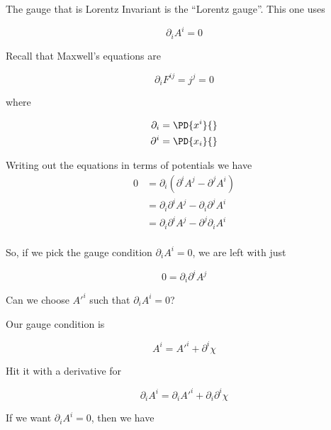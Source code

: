 The gauge that is Lorentz Invariant is the ``Lorentz gauge''.  This one uses

\begin{equation}\label{eqn:relativisticElectrodynamicsL14:390}
\partial_i A^i = 0
\end{equation}

Recall that Maxwell's equations are

\begin{equation}\label{eqn:relativisticElectrodynamicsL14:410}
\partial_i F^{ij} = j^j = 0
\end{equation}

where 

\begin{align}\label{eqn:relativisticElectrodynamicsL14:430}
\partial_i &= \PD{x^i}{} \\
\partial^i &= \PD{x_i}{}
\end{align}

Writing out the equations in terms of potentials we have
\begin{align*}
0 &= \partial_i (\partial^i A^j - \partial^j A^i)  \\
&= \partial_i \partial^i A^j - \partial_i \partial^j A^i \\
&= \partial_i \partial^i A^j - \partial^j \partial_i A^i \\
\end{align*}

So, if we pick the gauge condition $\partial_i A^i = 0$, we are left with just 

\begin{equation}\label{eqn:relativisticElectrodynamicsL14:450}
0 = \partial_i \partial^i A^j
\end{equation}

Can we choose ${A'}^i$ such that $\partial_i A^i = 0$?

Our gauge condition is 

\begin{equation}\label{eqn:relativisticElectrodynamicsL14:470}
A^i = {A'}^i + \partial^i \chi
\end{equation}

Hit it with a derivative for

\begin{equation}\label{eqn:relativisticElectrodynamicsL14:490}
\partial_i A^i = \partial_i {A'}^i + \partial_i \partial^i \chi
\end{equation}

If we want $\partial_i A^i = 0$, then we have

